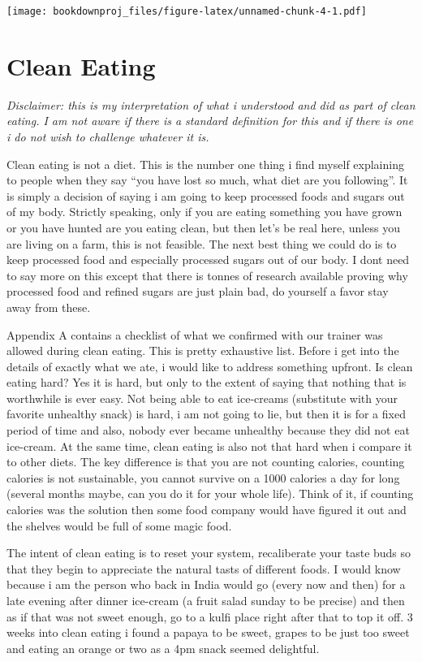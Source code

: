 \documentclass[oneside]{book}
\begin{document}
\texttt{[image: bookdownproj\_files/figure-latex/unnamed-chunk-4-1.pdf]}

\chapter{Clean Eating}\label{clean-eating}

\emph{Disclaimer: this is my interpretation of what i understood and did
as part of clean eating. I am not aware if there is a standard
definition for this and if there is one i do not wish to challenge
whatever it is.}

Clean eating is not a diet. This is the number one thing i find myself
explaining to people when they say ``you have lost so much, what diet
are you following''. It is simply a decision of saying i am going to
keep processed foods and sugars out of my body. Strictly speaking, only
if you are eating something you have grown or you have hunted are you
eating clean, but then let's be real here, unless you are living on a
farm, this is not feasible. The next best thing we could do is to keep
processed food and especially processed sugars out of our body. I dont
need to say more on this except that there is tonnes of research
available proving why processed food and refined sugars are just plain
bad, do yourself a favor stay away from these.

Appendix A contains a checklist of what we confirmed with our trainer
was allowed during clean eating. This is pretty exhaustive list. Before
i get into the details of exactly what we ate, i would like to address
something upfront. Is clean eating hard? Yes it is hard, but only to the
extent of saying that nothing that is worthwhile is ever easy. Not being
able to eat ice-creams (substitute with your favorite unhealthy snack)
is hard, i am not going to lie, but then it is for a fixed period of
time and also, nobody ever became unhealthy because they did not eat
ice-cream. At the same time, clean eating is also not that hard when i
compare it to other diets. The key difference is that you are not
counting calories, counting calories is not sustainable, you cannot
survive on a 1000 calories a day for long (several months maybe, can you
do it for your whole life). Think of it, if counting calories was the
solution then some food company would have figured it out and the
shelves would be full of some magic food.

The intent of clean eating is to reset your system, recaliberate your
taste buds so that they begin to appreciate the natural tasts of
different foods. I would know because i am the person who back in India
would go (every now and then) for a late evening after dinner ice-cream
(a fruit salad sunday to be precise) and then as if that was not sweet
enough, go to a kulfi place right after that to top it off. 3 weeks into
clean eating i found a papaya to be sweet, grapes to be just too sweet
and eating an orange or two as a 4pm snack seemed delightful.
\end{document}
